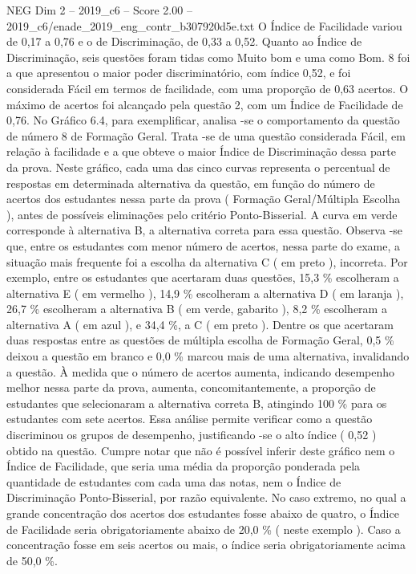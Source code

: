 \begin{textsample}{NEG Dim 2 – 2019\_c6 – Score 2.00 – 2019\_c6/enade\_2019\_eng\_contr\_b307920d5e.txt}
O Índice de Facilidade variou de 0,17 a 0,76 e o de Discriminação, de 0,33 a 0,52.
Quanto ao Índice de Discriminação, seis questões foram tidas como Muito bom e uma como Bom. 8 foi a que apresentou o maior poder discriminatório, com índice 0,52, e foi considerada Fácil em termos de facilidade, com uma proporção de 0,63 acertos.
O máximo de acertos foi alcançado pela questão 2, com um Índice de Facilidade de 0,76.
No Gráfico 6.4, para exemplificar, analisa -se o comportamento da questão de número 8 de Formação Geral.
Trata -se de uma questão considerada Fácil, em relação à facilidade e a que obteve o maior Índice de Discriminação dessa parte da prova.
Neste gráfico, cada uma das cinco curvas representa o percentual de respostas em determinada alternativa da questão, em função do número de acertos dos estudantes nessa parte da prova ( Formação Geral/Múltipla Escolha ), antes de possíveis eliminações pelo critério Ponto-Bisserial.
A curva em verde corresponde à alternativa B, a alternativa correta para essa questão.
Observa -se que, entre os estudantes com menor número de acertos, nessa parte do exame, a situação mais frequente foi a escolha da alternativa C ( em preto ), incorreta.
Por exemplo, entre os estudantes que acertaram duas questões, 15,3 \% escolheram a alternativa E ( em vermelho ), 14,9 \% escolheram a alternativa D ( em laranja ), 26,7 \% escolheram a alternativa B ( em verde, gabarito ), 8,2 \% escolheram a alternativa A ( em azul ), e 34,4 \%, a C ( em preto ).
Dentre os que acertaram duas respostas entre as questões de múltipla escolha de Formação Geral, 0,5 \% deixou a questão em branco e 0,0 \% marcou mais de uma alternativa, invalidando a questão.
À medida que o número de acertos aumenta, indicando desempenho melhor nessa parte da prova, aumenta, concomitantemente, a proporção de estudantes que selecionaram a alternativa correta B, atingindo 100 \% para os estudantes com sete acertos.
Essa análise permite verificar como a questão discriminou os grupos de desempenho, justificando -se o alto índice ( 0,52 ) obtido na questão.
Cumpre notar que não é possível inferir deste gráfico nem o Índice de Facilidade, que seria uma média da proporção ponderada pela quantidade de estudantes com cada uma das notas, nem o Índice de Discriminação Ponto-Bisserial, por razão equivalente.
No caso extremo, no qual a grande concentração dos acertos dos estudantes fosse abaixo de quatro, o Índice de Facilidade seria obrigatoriamente abaixo de 20,0 \% ( neste exemplo ).
Caso a concentração fosse em seis acertos ou mais, o índice seria obrigatoriamente acima de 50,0 \%.

\end{textsample}
